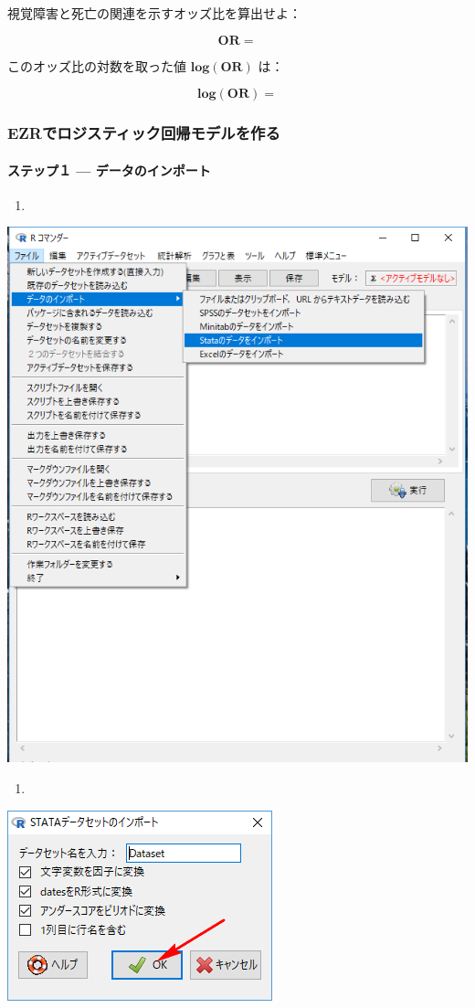 \documentclass[11pt,]{problemset}
\let\oldparagraph\paragraph
\renewcommand{\paragraph}[1]{\oldparagraph{#1}\mbox{}}
\begin{document}
\bigskip

視覚障害と死亡の関連を示すオッズ比を算出せよ：

\[
\mathbf{OR} = 
\]

このオッズ比の対数を取った値 \(\mathbf{log(OR)}\) は：

\[
\mathbf{log(OR)} = 
\]

\hypertarget{ezr}{%
\subsubsection{EZRでロジスティック回帰モデルを作る}\label{ezr}}

\hypertarget{-}{%
\paragraph{ステップ１ --- データのインポート}\label{-}}

\begin{enumerate}
\def\labelenumi{\arabic{enumi}.}
\item
\end{enumerate}

\begin{center}\includegraphics[width=0.5\linewidth]{pic/import00} \end{center}

\begin{enumerate}
\def\labelenumi{\arabic{enumi}.}
\setcounter{enumi}{1}
\item
\end{enumerate}

\begin{center}\includegraphics[width=0.3\linewidth]{pic/logstic01} \end{center}
\end{document}
